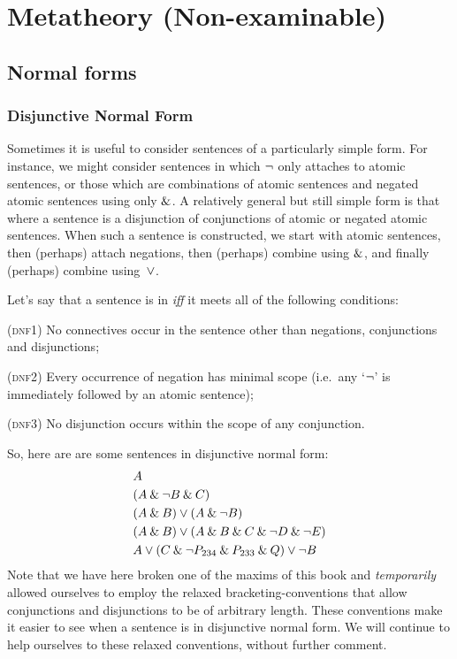 \part{Metatheory (Non-examinable)}
\label{ch:metatheory}
\chapter{Normal forms}
\label{ch:normalform}

\section{Disjunctive Normal Form}\label{s:DNFDefined}

Sometimes it is useful to consider sentences of a particularly simple form. For instance, we might consider sentences in which $\neg$ only attaches to atomic sentences, or those which are combinations of atomic sentences and negated atomic sentences using only $\mathbin{\&}$.  A relatively general but still simple form is that where a sentence is a disjunction of conjunctions of atomic or negated atomic sentences.  When such a sentence is constructed, we start with atomic sentences, then (perhaps) attach negations, then (perhaps) combine using $\mathbin{\&}$, and finally (perhaps) combine using~$\vee$.

Let's say that a sentence is in  \emph{iff} it meets all of the following conditions:
	\begin{earg}
		\item[(\textsc{dnf1})] No connectives occur in the sentence other than negations, conjunctions and disjunctions;
		\item[(\textsc{dnf2})] Every occurrence of negation has minimal scope (i.e.\ any `$\neg$' is immediately followed by an atomic sentence);
		\item[(\textsc{dnf3})] No disjunction occurs within the scope of any conjunction.
	\end{earg}
So, here are are some sentences in disjunctive normal form:
\begin{align*}
  & A \\
  & (A \mathbin{\&} \lnot B \mathbin{\&} C)\\
  & (A \mathbin{\&} B) \vee (A \mathbin{\&} \neg B)\\
  & (A \mathbin{\&} B) \vee (A \mathbin{\&}  B \mathbin{\&} C \mathbin{\&} \neg D \mathbin{\&} \neg E)\\
  & A \vee (C \mathbin{\&} \neg P_{234} \mathbin{\&} P_{233} \mathbin{\&} Q) \vee \neg B
\end{align*}
Note that we have here broken one of the maxims of this book and \emph{temporarily} allowed ourselves to employ the relaxed bracketing-conventions that allow conjunctions and disjunctions to be of arbitrary length. These conventions make it easier to see when a sentence is in disjunctive normal form. We will continue to help ourselves to these relaxed conventions, without further comment.

